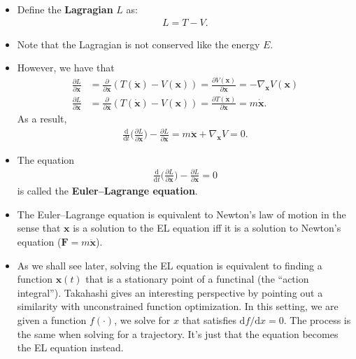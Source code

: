 \documentclass[10pt]{article}
\newcommand{\dee}{\mathrm{d}}
\newcommand{\ve}[1]{\mathbf{#1}}
\begin{document}
  \begin{itemize}
  	\item Define the {\bf Lagragian} $L$ as:
  	\begin{align*}
  		L = T - V.
  	\end{align*}

  	\item Note that the Lagragian is not conserved like the energy $E$.

  	\item However, we have that
  	\begin{align*}
  		\frac{\partial L}{\partial \ve{x}} 
  		&= \frac{\partial }{\partial \ve{x}} (T(\dot{\ve{x}}) - V(\ve{x}))
  		= \frac{\partial V(\ve{x})}{\partial \ve{x}}
  		= - \nabla_{\ve{x}} V(\ve{x}) \\
  		\frac{\partial L}{\partial \dot{\ve{x}}}
  		&= \frac{\partial }{\partial \overline{\ve{x}}} (T(\dot{\ve{x}}) - V(\ve{x}))
  		= \frac{\partial T(\dot{\ve{x}})}{\partial \dot{\ve{x}}}
  		= m\dot{\ve{x}}.
  	\end{align*}
  	As a result,
  	\begin{align*}
  		\frac{\dee}{\dee t}\bigg( \frac{\partial L}{\partial \dot{\ve{x}}} \bigg) 
  		- \frac{\partial L}{\partial \ve{x}}
  		= m\ddot{\ve{x}} + \nabla_{\ve{x}} V = 0.
  	\end{align*}

  	\item The equation
  	\begin{align*}
  		\frac{\dee}{\dee t}\bigg( \frac{\partial L}{\partial \ve{x}} \bigg) - \frac{\partial L}{\partial \ve{x}} = 0
  	\end{align*}
  	is called the {\bf Euler--Lagrange equation}.

  	\item The Euler--Lagrange equation is equivalent to Newton's law of motion in the sense that $\ve{x}$ is a solution to the EL equation iff it is a solution to Newton's equation ($\ve{F} = m\ddot{\ve{x}}$).

  	\item As we shall see later, solving the EL equation is equivalent to finding a function $\ve{x}(t)$ that is a stationary point of a functinal (the ``action integral''). Takahashi gives an interesting perspective by pointing out a similarity with unconstrained function optimization. In this setting, we are given a function $f(\cdot)$, we solve for $x$ that satisfies $\dee f / \dee x = 0$. The process is the same when solving for a trajectory. It's just that the equation becomes the EL equation instead.
  \end{itemize}
\end{document}
